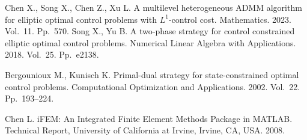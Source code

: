 \documentclass[12pt]{llncs}
\begin{document}

\begin{thebibliography}{99} %

Chen X., Song X., Chen Z., Xu L. A multilevel heterogeneous ADMM algorithm for elliptic optimal control problems with $L^1$-control cost. Mathematics. 2023. 
Vol.~11. Pp.~570.
Song X., Yu B. A two‐phase strategy for control constrained elliptic optimal control problems. Numerical Linear Algebra with Applications. 2018.
Vol.~25. Pp.~e2138.

Bergounioux M., Kunisch K. Primal-dual strategy for state-constrained optimal control problems.
Computational Optimization and Applications. 2002. Vol.~22. Pp.~193–224.

 Chen L. iFEM: An Integrated Finite Element Methods Package in MATLAB. Technical Report, University of California at Irvine, Irvine, CA, USA. 2008.


\end{thebibliography}

\end{document}
